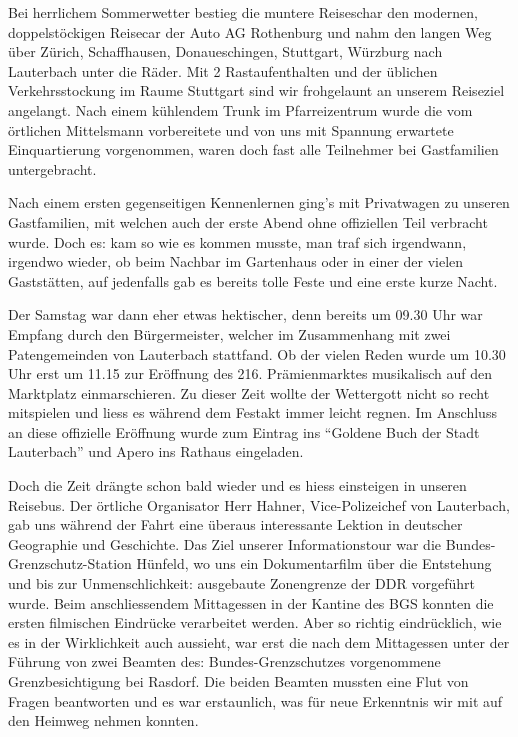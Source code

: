 \begin{history}
\begin{itemize}
              Bei herrlichem Sommerwetter bestieg die muntere Reiseschar den modernen,
              doppelstöckigen Reisecar der Auto AG Rothenburg und nahm den langen Weg
              über Zürich, Schaffhausen, Donaueschingen, Stuttgart, Würzburg nach
              Lauterbach unter die Räder. Mit 2 Rastaufenthalten und der üblichen
              Verkehrsstockung im Raume Stuttgart sind wir frohgelaunt an unserem
              Reiseziel angelangt. Nach einem kühlendem Trunk im Pfarreizentrum wurde
              die vom örtlichen Mittelsmann vorbereitete und von uns mit Spannung
              erwartete Einquartierung vorgenommen, waren doch fast alle Teilnehmer
              bei Gastfamilien untergebracht.

              Nach einem ersten gegenseitigen Kennenlernen ging's mit Privatwagen zu
              unseren Gastfamilien, mit welchen auch der erste Abend ohne offiziellen
              Teil verbracht wurde. Doch es: kam so wie es kommen musste, man traf
              sich irgendwann, irgendwo wieder, ob beim Nachbar im Gartenhaus oder in
              einer der vielen Gaststätten, auf jedenfalls gab es bereits tolle Feste
              und eine erste kurze Nacht.

              Der Samstag war dann eher etwas hektischer, denn bereits um 09.30 Uhr
              war Empfang durch den Bürgermeister, welcher im Zusammenhang mit zwei
              Patengemeinden von Lauterbach stattfand. Ob der vielen Reden wurde um
              10.30 Uhr erst um 11.15 zur Eröffnung des 216. Prämienmarktes
              musikalisch auf den Marktplatz einmarschieren. Zu dieser Zeit wollte der
              Wettergott nicht so recht mitspielen und liess es während dem Festakt
              immer leicht regnen. Im Anschluss an diese offizielle Eröffnung wurde
              zum Eintrag ins \enquote{Goldene Buch der Stadt Lauterbach} und Apero
              ins Rathaus eingeladen.

              Doch die Zeit drängte schon bald wieder und es hiess einsteigen in
              unseren Reisebus. Der örtliche Organisator Herr Hahner, Vice-Polizeichef
              von Lauterbach, gab uns während der Fahrt eine überaus interessante
              Lektion in deutscher Geographie und Geschichte. Das Ziel unserer
              Informationstour war die Bundes-Grenzschutz-Station Hünfeld, wo uns ein
              Dokumentarfilm über die Entstehung und bis zur Unmenschlichkeit:
              ausgebaute Zonengrenze der DDR vorgeführt wurde. Beim anschliessendem
              Mittagessen in der Kantine des BGS konnten die ersten filmischen
              Eindrücke verarbeitet werden. Aber so richtig eindrücklich, wie es in
              der Wirklichkeit auch aussieht, war erst die nach dem Mittagessen unter
              der Führung von zwei Beamten des: Bundes-Grenzschutzes vorgenommene
              Grenzbesichtigung bei Rasdorf. Die beiden Beamten mussten eine Flut von
              Fragen beantworten und es war erstaunlich, was für neue Erkenntnis wir
              mit auf den Heimweg nehmen konnten.


\end{itemize}
\end{history}
